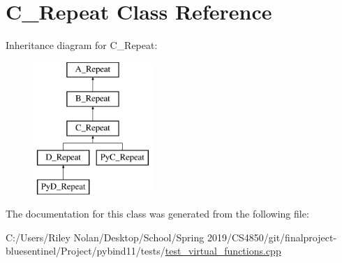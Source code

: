 \hypertarget{class_c___repeat}{}\section{C\+\_\+\+Repeat Class Reference}
\label{class_c___repeat}
Inheritance diagram for C\+\_\+\+Repeat\+:\begin{figure}[H]
\begin{center}
\leavevmode
\includegraphics[height=5.000000cm]{class_c___repeat}
\end{center}
\end{figure}


The documentation for this class was generated from the following file\+:\begin{DoxyCompactItemize}
\item 
C\+:/\+Users/\+Riley Nolan/\+Desktop/\+School/\+Spring 2019/\+C\+S4850/git/finalproject-\/bluesentinel/\+Project/pybind11/tests/\mbox{\hyperlink{test__virtual__functions_8cpp}{test\+\_\+virtual\+\_\+functions.\+cpp}}\end{DoxyCompactItemize}
